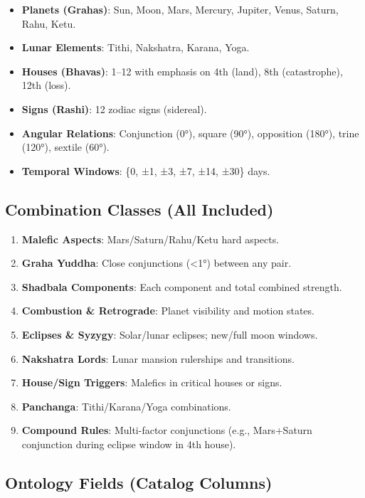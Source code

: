 \documentclass[
  11pt,
  a4paper,
  oneside,
  openany]{article}
\providecommand{\tightlist}{%
  \setlength{\itemsep}{0pt}\setlength{\parskip}{0pt}}\usepackage{longtable,booktabs,array}
\begin{document}
\begin{itemize}
\tightlist
\item
  \textbf{Planets (Grahas)}: Sun, Moon, Mars, Mercury, Jupiter, Venus,
  Saturn, Rahu, Ketu.
\item
  \textbf{Lunar Elements}: Tithi, Nakshatra, Karana, Yoga.
\item
  \textbf{Houses (Bhavas)}: 1--12 with emphasis on 4th (land), 8th
  (catastrophe), 12th (loss).
\item
  \textbf{Signs (Rashi)}: 12 zodiac signs (sidereal).
\item
  \textbf{Angular Relations}: Conjunction (0°), square (90°), opposition
  (180°), trine (120°), sextile (60°).
\item
  \textbf{Temporal Windows}: \{0, ±1, ±3, ±7, ±14, ±30\} days.
\end{itemize}

\subsection{Combination Classes (All
Included)}\label{combination-classes-all-included}

\begin{enumerate}
\def\labelenumi{\arabic{enumi}.}
\tightlist
\item
  \textbf{Malefic Aspects}: Mars/Saturn/Rahu/Ketu hard aspects.
\item
  \textbf{Graha Yuddha}: Close conjunctions (\textless1°) between any
  pair.
\item
  \textbf{Shadbala Components}: Each component and total combined
  strength.
\item
  \textbf{Combustion \& Retrograde}: Planet visibility and motion
  states.
\item
  \textbf{Eclipses \& Syzygy}: Solar/lunar eclipses; new/full moon
  windows.
\item
  \textbf{Nakshatra Lords}: Lunar mansion rulerships and transitions.
\item
  \textbf{House/Sign Triggers}: Malefics in critical houses or signs.
\item
  \textbf{Panchanga}: Tithi/Karana/Yoga combinations.
\item
  \textbf{Compound Rules}: Multi-factor conjunctions (e.g., Mars+Saturn
  conjunction during eclipse window in 4th house).
\end{enumerate}

\subsection{Ontology Fields (Catalog
Columns)}\label{ontology-fields-catalog-columns}
\end{document}
